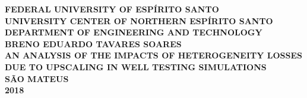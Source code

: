 \begin{titlepage} 
	\center
	
	\textsc{\textbf{FEDERAL UNIVERSITY OF ESP\'IRITO SANTO}}\\

	\textsc{\textbf{UNIVERSITY CENTER OF NORTHERN ESP\'IRITO SANTO}}\\

	\textsc{\textbf{DEPARTMENT OF ENGINEERING AND TECHNOLOGY}}\\[140pt]
	
	\textsc{\textbf{BRENO EDUARDO TAVARES SOARES}}\\[140pt]
		
	\textsc{\textbf{AN ANALYSIS OF THE IMPACTS OF HETEROGENEITY LOSSES DUE TO UPSCALING IN WELL TESTING SIMULATIONS}}\\[140pt]
	
	\textsc{\textbf{S\~AO MATEUS}}\\
	\textsc{\textbf{2018}}\\
\end{titlepage}
